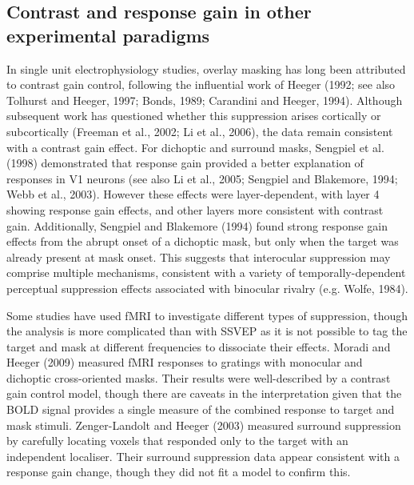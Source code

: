 \documentclass[]{article}
\begin{document}
\hypertarget{contrast-and-response-gain-in-other-experimental-paradigms}{%
\subsection{Contrast and response gain in other experimental paradigms}\label{contrast-and-response-gain-in-other-experimental-paradigms}}

In single unit electrophysiology studies, overlay masking has long been attributed to contrast gain control, following the influential work of Heeger (1992; see also Tolhurst and Heeger, 1997; Bonds, 1989; Carandini and Heeger, 1994). Although subsequent work has questioned whether this suppression arises cortically or subcortically (Freeman et al., 2002; Li et al., 2006), the data remain consistent with a contrast gain effect. For dichoptic and surround masks, Sengpiel et al. (1998) demonstrated that response gain provided a better explanation of responses in V1 neurons (see also Li et al., 2005; Sengpiel and Blakemore, 1994; Webb et al., 2003). However these effects were layer-dependent, with layer 4 showing response gain effects, and other layers more consistent with contrast gain. Additionally, Sengpiel and Blakemore (1994) found strong response gain effects from the abrupt onset of a dichoptic mask, but only when the target was already present at mask onset. This suggests that interocular suppression may comprise multiple mechanisms, consistent with a variety of temporally-dependent perceptual suppression effects associated with binocular rivalry (e.g. Wolfe, 1984).

Some studies have used fMRI to investigate different types of suppression, though the analysis is more complicated than with SSVEP as it is not possible to tag the target and mask at different frequencies to dissociate their effects. Moradi and Heeger (2009) measured fMRI responses to gratings with monocular and dichoptic cross-oriented masks. Their results were well-described by a contrast gain control model, though there are caveats in the interpretation given that the BOLD signal provides a single measure of the combined response to target and mask stimuli. Zenger-Landolt and Heeger (2003) measured surround suppression by carefully locating voxels that responded only to the target with an independent localiser. Their surround suppression data appear consistent with a response gain change, though they did not fit a model to confirm this.
\end{document}
